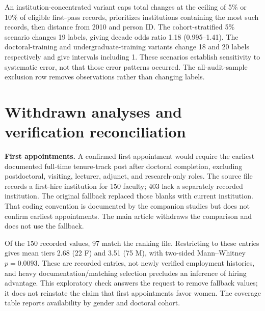 \documentclass[11pt]{article}
\begin{document}
An institution-concentrated variant caps total changes at the ceiling of 5\% or 10\% of eligible first-pass records, prioritizes institutions containing the most such records, then distance from 2010 and person ID. The cohort-stratified 5\% scenario changes 19 labels, giving decade odds ratio 1.18 (0.995--1.41). The doctoral-training and undergraduate-training variants change 18 and 20 labels respectively and give intervals including 1. These scenarios establish sensitivity to systematic error, not that those error patterns occurred. The all-audit-sample exclusion row removes observations rather than changing labels.
\begin{table}[ht]\centering\small\caption{Imposed error scenarios and sample exclusion.}\resizebox{\textwidth}{!}{}\end{table}

\section{Withdrawn analyses and verification reconciliation}\label{sec:withdrawn}
\textbf{First appointments.} A confirmed first appointment would require the earliest documented full-time tenure-track post after doctoral completion, excluding postdoctoral, visiting, lecturer, adjunct, and research-only roles. The source file records a first-hire institution for 150 faculty; 403 lack a separately recorded institution. The original fallback replaced those blanks with current institution. That coding convention is documented by the companion studies but does not confirm earliest appointments. The main article withdraws the comparison and does not use the fallback.

Of the 150 recorded values, 97 match the ranking file. Restricting to these entries gives mean tiers 2.68 (22 F) and 3.51 (75 M), with two-sided Mann--Whitney $p=0.0093$. These are recorded entries, not newly verified employment histories, and heavy documentation/matching selection precludes an inference of hiring advantage. This exploratory check answers the request to remove fallback values; it does not reinstate the claim that first appointments favor women. The coverage table reports availability by gender and doctoral cohort.
\begin{table}[ht]\centering\small\caption{Separately recorded first-hire institutions; missing counts identify the former fallback cases.}\end{table}
\end{document}
